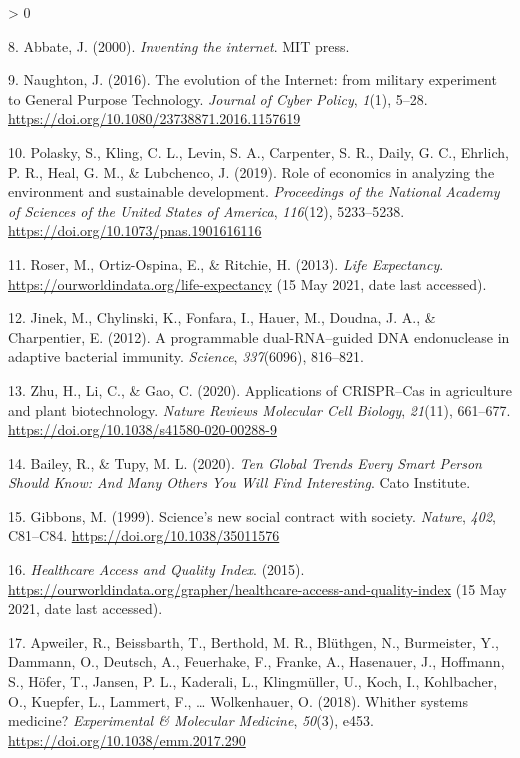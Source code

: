 \documentclass[
  12pt,
]{book}
\newlength{\cslhangindent}
\newenvironment{CSLReferences}[2] %
 {%
  \setlength{\parindent}{0pt}
  \ifodd #1 \everypar{\setlength{\hangindent}{\cslhangindent}}\ignorespaces\fi
  \ifnum #2 > 0
  \setlength{\parskip}{#2\baselineskip}
  \fi
 }%
 {}
\begin{document}
\begin{CSLReferences}{1}{0}
\leavevmode\hypertarget{ref-Abbate2000}{}%
8. Abbate, J. (2000). \emph{{Inventing the internet}}. MIT press.

\leavevmode\hypertarget{ref-Naughton2016}{}%
9. Naughton, J. (2016). {The evolution of the Internet: from military experiment to General Purpose Technology}. \emph{Journal of Cyber Policy}, \emph{1}(1), 5--28. \url{https://doi.org/10.1080/23738871.2016.1157619}

\leavevmode\hypertarget{ref-Polasky2019}{}%
10. Polasky, S., Kling, C. L., Levin, S. A., Carpenter, S. R., Daily, G. C., Ehrlich, P. R., Heal, G. M., \& Lubchenco, J. (2019). {Role of economics in analyzing the environment and sustainable development}. \emph{Proceedings of the National Academy of Sciences of the United States of America}, \emph{116}(12), 5233--5238. \url{https://doi.org/10.1073/pnas.1901616116}

\leavevmode\hypertarget{ref-Roser2013}{}%
11. Roser, M., Ortiz-Ospina, E., \& Ritchie, H. (2013). \emph{{Life Expectancy}}. \url{https://ourworldindata.org/life-expectancy} (15 May 2021, date last accessed).

\leavevmode\hypertarget{ref-Jinek2012}{}%
12. Jinek, M., Chylinski, K., Fonfara, I., Hauer, M., Doudna, J. A., \& Charpentier, E. (2012). {A programmable dual-RNA--guided DNA endonuclease in adaptive bacterial immunity}. \emph{Science}, \emph{337}(6096), 816--821.

\leavevmode\hypertarget{ref-Zhu2020}{}%
13. Zhu, H., Li, C., \& Gao, C. (2020). {Applications of CRISPR--Cas in agriculture and plant biotechnology}. \emph{Nature Reviews Molecular Cell Biology}, \emph{21}(11), 661--677. \url{https://doi.org/10.1038/s41580-020-00288-9}

\leavevmode\hypertarget{ref-Bailey2020}{}%
14. Bailey, R., \& Tupy, M. L. (2020). \emph{{Ten Global Trends Every Smart Person Should Know: And Many Others You Will Find Interesting}}. Cato Institute.

\leavevmode\hypertarget{ref-Gibbons1999}{}%
15. Gibbons, M. (1999). {Science's new social contract with society}. \emph{Nature}, \emph{402}, C81--C84. \url{https://doi.org/10.1038/35011576}

\leavevmode\hypertarget{ref-HAQ2015}{}%
16. \emph{{Healthcare Access and Quality Index}}. (2015). \url{https://ourworldindata.org/grapher/healthcare-access-and-quality-index} (15 May 2021, date last accessed).

\leavevmode\hypertarget{ref-Apweiler2018}{}%
17. Apweiler, R., Beissbarth, T., Berthold, M. R., Blüthgen, N., Burmeister, Y., Dammann, O., Deutsch, A., Feuerhake, F., Franke, A., Hasenauer, J., Hoffmann, S., Höfer, T., Jansen, P. L., Kaderali, L., Klingmüller, U., Koch, I., Kohlbacher, O., Kuepfer, L., Lammert, F., \ldots{} Wolkenhauer, O. (2018). {Whither systems medicine?} \emph{Experimental {\&} Molecular Medicine}, \emph{50}(3), e453. \url{https://doi.org/10.1038/emm.2017.290}


\end{CSLReferences}
\end{document}
